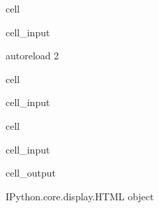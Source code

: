 \documentclass[letterpaper,10pt,english]{jupyterBook}
\begin{document}
\begin{sphinxuseclass}{cell}\begin{sphinxVerbatimInput}

\begin{sphinxuseclass}{cell_input}
\begin{sphinxVerbatim}[commandchars=\\\{\}]
 autoreload
 2
\end{sphinxVerbatim}

\end{sphinxuseclass}\end{sphinxVerbatimInput}

\end{sphinxuseclass}
\begin{sphinxuseclass}{cell}\begin{sphinxVerbatimInput}

\begin{sphinxuseclass}{cell_input}
\begin{sphinxVerbatim}[commandchars=\\\{\}]
   
\end{sphinxVerbatim}

\end{sphinxuseclass}\end{sphinxVerbatimInput}

\end{sphinxuseclass}
\begin{sphinxuseclass}{cell}\begin{sphinxVerbatimInput}

\begin{sphinxuseclass}{cell_input}
\begin{sphinxVerbatim}[commandchars=\\\{\}]
    
   
\end{sphinxVerbatim}

\end{sphinxuseclass}\end{sphinxVerbatimInput}
\begin{sphinxVerbatimOutput}

\begin{sphinxuseclass}{cell_output}
\begin{sphinxVerbatim}[commandchars=\\\{\}]
\PYGZlt{}IPython.core.display.HTML object\PYGZgt{}
\end{sphinxVerbatim}

\end{sphinxuseclass}\end{sphinxVerbatimOutput}

\end{sphinxuseclass}
\end{document}
